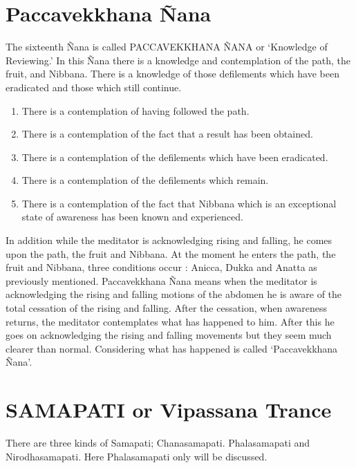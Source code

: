 \documentclass[a5paper,10pt,english]{book}
\begin{document}
\section{Paccavekkhana Ñana}
\label{\detokenize{progress:paccavekkhana-nana}}
\sphinxAtStartPar
The sixteenth Ñana is called PACCAVEKKHANA ÑANA or ‘Knowledge of Reviewing.’ In this Ñana there is a knowledge and contemplation of the path, the fruit, and Nibbana. There is a knowledge of those defilements which have been eradicated and those which still continue.
\begin{enumerate}
%
\item {} 
\sphinxAtStartPar
There is a contemplation of having followed the path.

\item {} 
\sphinxAtStartPar
There is a contemplation of the fact that a result has been obtained.

\item {} 
\sphinxAtStartPar
There is a contemplation of the defilements which have been eradicated.

\item {} 
\sphinxAtStartPar
There is a contemplation of the defilements which remain.

\item {} 
\sphinxAtStartPar
There is a contemplation of the fact that Nibbana which is an exceptional state of awareness has been known and experienced.

\end{enumerate}

\sphinxAtStartPar
In addition while the meditator is acknowledging rising and falling, he comes upon the path, the fruit and Nibbana. At the moment he enters the path, the fruit and Nibbana, three conditions occur : Anicca, Dukka and Anatta as previously mentioned. Paccavekkhana Ñana means when the meditator is acknowledging the rising and falling motions of the abdomen he is aware of the total cessation of the rising and falling. After the cessation, when awareness returns, the meditator contemplates what has happened to him. After this he goes on acknowledging the rising and falling movements but they seem much clearer than normal. Considering what has happened is called ‘Paccavekkhana Ñana’.


\section{SAMAPATI or Vipassana Trance}
\label{\detokenize{progress:samapati-or-vipassana-trance}}
\sphinxAtStartPar
There are three kinds of Samapati; Chanasamapati. Phalasamapati and Nirodhasamapati. Here Phalasamapati only will be discussed.
\end{document}
